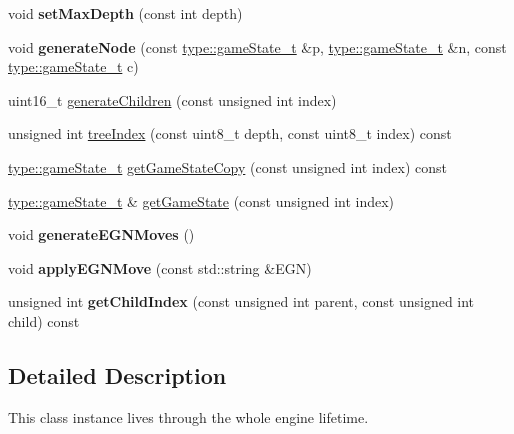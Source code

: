 \begin{DoxyCompactItemize}
void {\bfseries set\+Max\+Depth} (const int depth)
\item 
\mbox{\label{classdavid_1_1gameTree_1_1TreeGen_a63d50ceeb1993012ae8f956f4476948a}} 
void {\bfseries generate\+Node} (const \hyperlink{structdavid_1_1bitboard_1_1gameState}{type\+::game\+State\+\_\+t} \&p, \hyperlink{structdavid_1_1bitboard_1_1gameState}{type\+::game\+State\+\_\+t} \&n, const \hyperlink{structdavid_1_1bitboard_1_1gameState}{type\+::game\+State\+\_\+t} c)
\item 
uint16\+\_\+t \hyperlink{classdavid_1_1gameTree_1_1TreeGen_a330f72db3d31bbd75e8cf8a452b55d26}{generate\+Children} (const unsigned int index)
\item 
unsigned int \hyperlink{classdavid_1_1gameTree_1_1TreeGen_af4174f1ef14a61e88cf241a82c1761c7}{tree\+Index} (const uint8\+\_\+t depth, const uint8\+\_\+t index) const
\item 
\hyperlink{structdavid_1_1bitboard_1_1gameState}{type\+::game\+State\+\_\+t} \hyperlink{classdavid_1_1gameTree_1_1TreeGen_a8c9344951f5f5ae2cdf77dbfb06f21a1}{get\+Game\+State\+Copy} (const unsigned int index) const
\item 
\hyperlink{structdavid_1_1bitboard_1_1gameState}{type\+::game\+State\+\_\+t} \& \hyperlink{classdavid_1_1gameTree_1_1TreeGen_aa2a2345e74895db50b8f3b5fb63c3087}{get\+Game\+State} (const unsigned int index)
\item 
\mbox{\label{classdavid_1_1gameTree_1_1TreeGen_aa60d9a73adafbc67e2f08e4914a1bc21}} 
void {\bfseries generate\+E\+G\+N\+Moves} ()
\item 
\mbox{\label{classdavid_1_1gameTree_1_1TreeGen_a58a1218cb529b5b42476bb1c4e18692c}} 
void {\bfseries apply\+E\+G\+N\+Move} (const std\+::string \&E\+GN)
\item 
\mbox{\label{classdavid_1_1gameTree_1_1TreeGen_ac7349dedac423993d192ac5e50839a23}} 
unsigned int {\bfseries get\+Child\+Index} (const unsigned int parent, const unsigned int child) const
\end{DoxyCompactItemize}


\subsection{Detailed Description}
This class instance lives through the whole engine lifetime.


